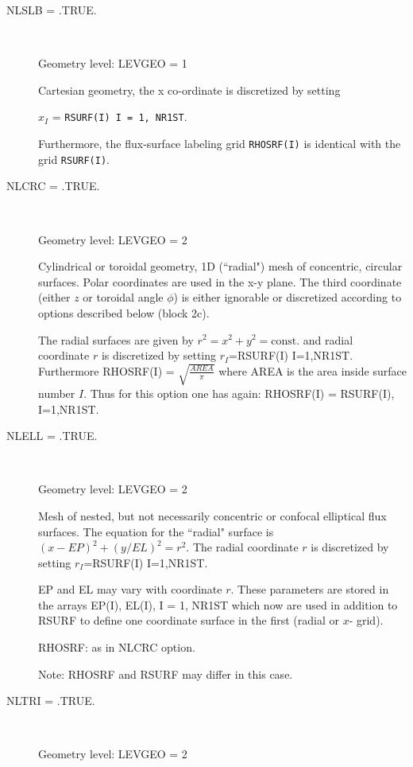 \begin{description}
  \item[NLSLB = .TRUE.
        ] ~

        Geometry level: LEVGEO = 1 

        Cartesian geometry, the x co-ordinate is discretized by setting

        $x_I$ = \lstinline|RSURF(I) I = 1, NR1ST|.

        Furthermore, the flux-surface labeling grid \lstinline|RHOSRF(I)| is identical
        with the grid \lstinline|RSURF(I)|.
  \item[NLCRC = .TRUE.
        ] ~

        Geometry level: LEVGEO = 2 

        Cylindrical or toroidal geometry, 1D (``radial") mesh of concentric, circular
        surfaces.
        Polar coordinates are used in the x-y plane.
        The third coordinate (either $z$ or toroidal angle $\phi$) is either ignorable
        or discretized according to options described below (block 2c).

        The radial surfaces are given by $r^2 = x^2 + y^2 = \mathrm{const.
          }
        $ and radial coordinate $r$ is discretized by setting $r_I$=RSURF(I) I=1,NR1ST.
        Furthermore RHOSRF(I) = $\sqrt{\frac{AREA}{\pi}}$ where AREA is the area inside
        surface number $I$.
        Thus for this option one has again: RHOSRF(I) = RSURF(I), I=1,NR1ST.
  \item[NLELL = .TRUE.
        ] ~

        Geometry level: LEVGEO = 2 

        Mesh of nested, but not necessarily concentric or confocal elliptical flux
        surfaces.
        The equation for the ``radial" surface is $(x - EP)^2 + (  y/EL )^2 = r^2$.
        The radial coordinate $r$ is discretized by setting $r_I$=RSURF(I) I=1,NR1ST.

        EP and EL may vary with coordinate $r$.
        These parameters are stored in the arrays EP(I), EL(I), I = 1, NR1ST which now
        are used in addition to RSURF to define one coordinate surface in the first
        (radial or $x$- grid).

        RHOSRF: as in NLCRC option.

        Note: RHOSRF and RSURF may differ in this case.
  \item[NLTRI = .TRUE.
        ] ~

        Geometry level: LEVGEO = 2 


\end{description}
